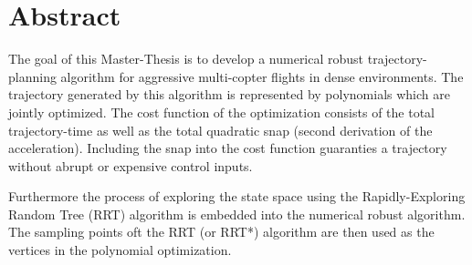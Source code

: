 




 \setcounter{tocdepth}{2}
 \tableofcontents

 \cleardoublepage







\chapter*{Abstract}

The goal of this Master-Thesis is to develop a numerical robust trajectory-planning algorithm for aggressive multi-copter flights in dense environments. The trajectory generated by this algorithm is represented by polynomials which are jointly optimized. The cost function of the optimization consists of the total trajectory-time as well as the total quadratic snap (second derivation of the acceleration). Including the snap into the cost function guaranties a trajectory without abrupt or expensive control inputs. \newline

Furthermore the process of exploring the state space using the Rapidly-Exploring Random Tree (RRT) algorithm is embedded into the numerical robust algorithm. The sampling points oft the RRT (or RRT*) algorithm are then used as the vertices in the polynomial optimization.


\newpage


